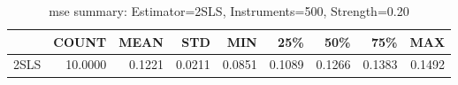 \begin{table}[ht]
\centering
\caption{mse summary: Estimator=2SLS, Instruments=500, Strength=0.20}
\begin{tabular}{lrrrrrrrr}
\toprule
 & COUNT & MEAN & STD & MIN & 25\% & 50\% & 75\% & MAX \\
\midrule
2SLS & 10.0000 & 0.1221 & 0.0211 & 0.0851 & 0.1089 & 0.1266 & 0.1383 & 0.1492 \\
\bottomrule
\end{tabular}
\end{table}
